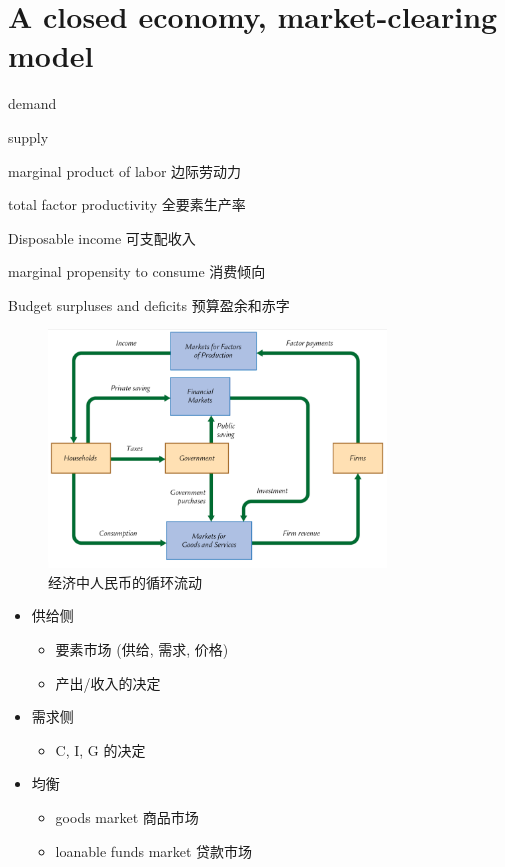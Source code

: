 \section{A closed economy, market-clearing model}
\begin{introduction}[Keywords]
    \item demand 
    \item supply 
    \item marginal product of labor 边际劳动力
    \item total factor productivity 全要素生产率
    \item Disposable income 可支配收入
    \item marginal propensity to consume 消费倾向
    \item Budget surpluses and deficits 预算盈余和赤字
\end{introduction}
\begin{figure}[htbp]
    \centering
    \includegraphics[width=0.8\textwidth]{image/RMBflow.png}
    \caption{经济中人民币的循环流动}
\end{figure}
\begin{itemize}
    \item 供给侧 
    \begin{itemize}
        \item 要素市场 (供给, 需求, 价格)
        \item 产出/收入的决定
    \end{itemize}
    \item 需求侧 
    \begin{itemize}
        \item C, I, G 的决定
    \end{itemize}
    \item 均衡
    \begin{itemize}
        \item goods market 商品市场
        \item loanable funds market 贷款市场
    \end{itemize}
\end{itemize}
\newpage
